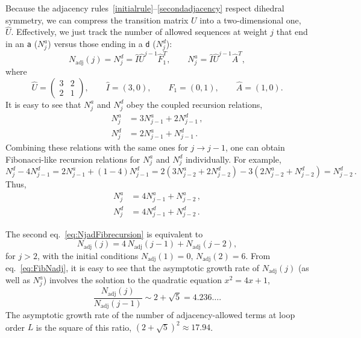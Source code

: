 \documentclass[12pt]{article}
\begin{document}
Because the adjacency rules~\ref{initialrule}--\ref{secondadjacency} respect dihedral symmetry, we can compress the transition matrix $U$ into a two-dimensional one, $\hat{U}$.  Effectively, we just track the number of allowed sequences at weight $j$ that end in an {\tt a} ($N_j^a$) versus those ending in a {\tt d} ($N_j^d$):
%
\begin{equation}
\label{eq:countingzeroshat}
N_{\text{adj}}(j) = N_j^d = \hat{I} \hat{U}^{j-1} \hat{F}_1^T , \qquad  N_j^a = \hat{I} \hat{U}^{j-1} \hat{A}^T ,
\end{equation}
%
where
%
\begin{equation}
    \hat{U}=\begin{pmatrix}3&2\\ 2&1\end{pmatrix}, \qquad \hat{I} = (3,0), \qquad \hat{F}_1 = (0,1), \qquad \hat{A} = (1,0).
    \label{eq:Uhat}
\end{equation}
%
It is easy to see that $N_j^a$ and $N_j^d$ obey the coupled recursion relations,
%
\begin{equation}
\begin{split}
N_j^a &= 3 N_{j-1}^a + 2 N_{j-1}^d \,, \\
N_j^d &= 2 N_{j-1}^a + N_{j-1}^d \,.
\end{split}
\label{eq:Njadrecursion}
\end{equation}
%
Combining these relations with the same ones for $j\to j-1$, one can obtain Fibonacci-like recursion relations for $N_j^a$ and $N_j^d$ individually.  For example,
%
\begin{equation}
N_j^d - 4 N_{j-1}^d = 2 N_{j-1}^a + (1-4) N_{j-1}^d = 2 ( 3 N_{j-2}^a + 2 N_{j-2}^d ) - 3 ( 2 N_{j-2}^a + N_{j-2}^d ) = N_{j-2}^d \,.
\end{equation}
%
Thus,
\begin{equation}
\begin{split}
N_j^a &= 4 N_{j-1}^a + N_{j-2}^a \,, \\
N_j^d &= 4 N_{j-1}^d + N_{j-2}^d \,.
\end{split}
\label{eq:NjadFibrecursion}
\end{equation}
%

The second eq.~\eqref{eq:NjadFibrecursion} is equivalent to
%
\begin{equation}
    N_{\text{adj}}(j) = 4 \, N_{\text{adj}}(j-1) + N_{\text{adj}}(j-2),
    \label{eq:FibNadj}
\end{equation}
%
for $j>2$, with the initial conditions $N_{\text{adj}}(1)=0$, $N_{\text{adj}}(2)=6$.  From eq.~\eqref{eq:FibNadj}, it is easy to see that the asymptotic growth rate of $N_{\text{adj}}(j)$ (as well as $N_j^a$) involves the solution to the quadratic equation $x^2=4x+1$,
%
\begin{equation}
    \frac{N_{\text{adj}}(j)}{N_{\text{adj}}(j-1)} \sim 2+\sqrt{5} = 4.236\ldots.
\end{equation}
%
The asymptotic growth rate of the number of adjacency-allowed terms at loop order $L$ is the square of this ratio, $(2+\sqrt{5})^2 \approx 17.94$.
\end{document}
